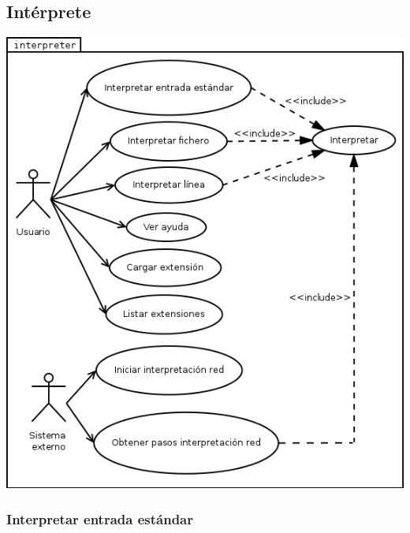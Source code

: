 
\subsection{Intérprete}
\begin{center}
\includegraphics[scale=0.5]{use_case_interpreter.png} \\
\end{center}
\subsubsection{Interpretar entrada estándar}

